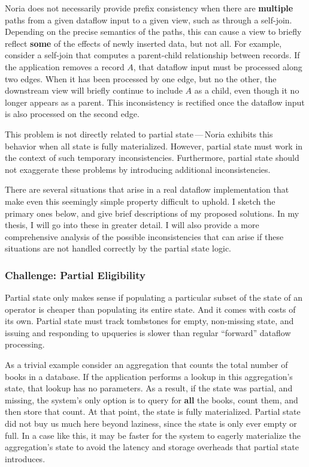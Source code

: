 \documentclass[fontsize=12pt,paper=letter]{scrartcl}
\begin{document}
Noria does not necessarily provide prefix consistency when there are
\textbf{multiple} paths from a given dataflow input to a given view, such as
through a self-join. Depending on the precise semantics of the paths, this can
cause a view to briefly reflect \textbf{some} of the effects of newly inserted
data, but not all. For example, consider a self-join that computes a
parent-child relationship between records. If the application removes a record
$A$, that dataflow input must be processed along two edges. When it has been
processed by one edge, but no the other, the downstream view will briefly
continue to include $A$ as a child, even though it no longer appears as a
parent. This inconsistency is rectified once the dataflow input is also
processed on the second edge.

This problem is not directly related to partial state\,---\,Noria exhibits this
behavior when all state is fully materialized. However, partial state must work
in the context of such temporary inconsistencies. Furthermore, partial state
should not exaggerate these problems by introducing additional inconsistencies.

There are several situations that arise in a real dataflow implementation that
make even this seemingly simple property difficult to uphold. I sketch the
primary ones below, and give brief descriptions of my proposed solutions. In my
thesis, I will go into these in greater detail. I will also provide a more
comprehensive analysis of the possible inconsistencies that can arise if these
situations are not handled correctly by the partial state logic.

\subsubsection{Challenge: Partial Eligibility}

Partial state only makes sense if populating a particular subset of the
state of an operator is cheaper than populating its entire state. And it
comes with costs of its own. Partial state must track tombstones for
empty, non-missing state, and issuing and responding to upqueries is
slower than regular ``forward'' dataflow processing.

As a trivial example consider an aggregation that counts the total
number of books in a database. If the application performs a lookup in
this aggregation's state, that lookup has no parameters. As a result, if
the state was partial, and missing, the system's only option is to query
for \textbf{all} the books, count them, and then store that count. At that
point, the state is fully materialized. Partial state did not buy us
much here beyond laziness, since the state is only ever empty or full.
In a case like this, it may be faster for the system to eagerly
materialize the aggregation's state to avoid the latency and storage
overheads that partial state introduces.
\end{document}
